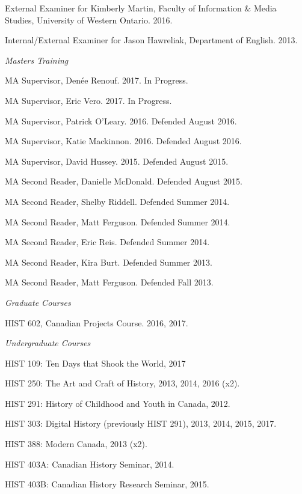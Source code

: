 \documentclass[11pt,article,oneside]{memoir}
\begin{document}
\ind External Examiner for Kimberly Martin, Faculty of Information \& Media Studies, University of Western Ontario. 2016.

\ind Internal/External Examiner for Jason Hawreliak, Department of English. 2013.

\medskip
\noindent\emph{Masters Training \vspace{0.01in}}

\ind MA Supervisor, Den\'ee Renouf. 2017. In Progress.

\ind MA Supervisor, Eric Vero. 2017. In Progress.

\ind MA Supervisor, Patrick O'Leary. 2016. Defended August 2016.

\ind MA Supervisor, Katie Mackinnon. 2016. Defended August 2016.

\ind MA Supervisor, David Hussey. 2015. Defended August 2015.

\ind MA Second Reader, Danielle McDonald. Defended August 2015.

\ind MA Second Reader, Shelby Riddell. Defended Summer 2014.

\ind MA Second Reader, Matt Ferguson. Defended Summer 2014.

\ind MA Second Reader, Eric Reis. Defended Summer 2014.

\ind MA Second Reader, Kira Burt. Defended Summer 2013.

\ind MA Second Reader, Matt Ferguson. Defended Fall 2013.

\medskip
\noindent\emph{Graduate Courses \vspace{0.05in}}

\ind HIST 602, Canadian Projects Course. 2016, 2017.

\medskip

\noindent\emph{Undergraduate Courses \vspace{0.05in}}

\ind HIST 109: Ten Days that Shook the World, 2017

\ind HIST 250: The Art and Craft of History, 2013, 2014, 2016 (x2).

\ind HIST 291: History of Childhood and Youth in Canada, 2012.

\ind HIST 303: Digital History (previously HIST 291), 2013, 2014, 2015, 2017.

\ind HIST 388: Modern Canada, 2013 (x2).

\ind HIST 403A: Canadian History Seminar, 2014.

\ind HIST 403B: Canadian History Research Seminar, 2015.
\end{document}
